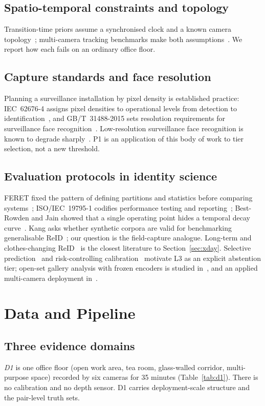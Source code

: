\documentclass[journal]{IEEEtran}
\begin{document}
\subsection{Spatio-temporal constraints and topology}
Transition-time priors assume a synchronised clock and a known camera topology~\cite{ristani2016,ristani2018,makris2004}; multi-camera tracking benchmarks make both assumptions~\cite{aicity2026}. We report how each fails on an ordinary office floor.

\subsection{Capture standards and face resolution}
Planning a surveillance installation by pixel density is established practice: IEC~62676-4 assigns pixel densities to operational levels from detection to identification~\cite{iec62676}, and GB/T~31488-2015 sets resolution requirements for surveillance face recognition~\cite{gbt31488}. Low-resolution surveillance face recognition is known to degrade sharply~\cite{cheng2018}. P1 is an application of this body of work to tier selection, not a new threshold.

\subsection{Evaluation protocols in identity science}
FERET fixed the pattern of defining partitions and statistics before comparing systems~\cite{phillips2000}; ISO/IEC~19795-1 codifies performance testing and reporting~\cite{iso19795}; Best-Rowden and Jain showed that a single operating point hides a temporal decay curve~\cite{bestrowden2018}. Kang asks whether synthetic corpora are valid for benchmarking generalisable ReID~\cite{kang2025}; our question is the field-capture analogue. Long-term and clothes-changing ReID~\cite{yang2021,gu2022} is the closest literature to Section~\ref{sec:xday}. Selective prediction~\cite{geifman2017} and risk-controlling calibration~\cite{angelopoulos2025} motivate L3 as an explicit abstention tier; open-set gallery analysis with frozen encoders is studied in~\cite{wang2026sensors}, and an applied multi-camera deployment in~\cite{ding2025}.

\section{Data and Pipeline}\label{sec:data}
\subsection{Three evidence domains}
\emph{D1} is one office floor (open work area, tea room, glass-walled corridor, multi-purpose space) recorded by six cameras for 35 minutes (Table~\ref{tab:d1}). There is no calibration and no depth sensor. D1 carries deployment-scale structure and the pair-level truth sets.
\end{document}
